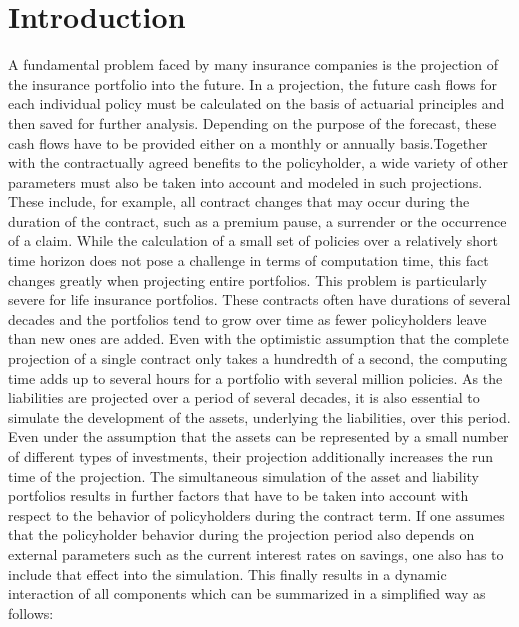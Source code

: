 

\chapter{Introduction}
\label{cha:introduction}

A fundamental problem faced by many insurance companies is the projection of the insurance portfolio into the future. In a projection, the future cash flows for each individual policy must be calculated on the basis of actuarial principles and then saved for further analysis. Depending on the purpose of the forecast, these cash flows have to be provided either on a monthly or annually basis.Together with the contractually agreed benefits to the policyholder, a wide variety of other parameters must also be taken into account and modeled in such projections. These include, for example, all contract changes that may occur during the duration of the contract, such as a premium pause, a surrender or the occurrence of a claim. While the calculation of a small set of policies over a relatively short time horizon does not pose a challenge in terms of computation time, this fact changes greatly when projecting entire portfolios. This problem is particularly severe for life insurance portfolios. These contracts often have durations of several decades and the portfolios tend to grow over time as fewer policyholders leave than new ones are added. Even with the optimistic assumption that the complete projection of a single contract only takes a hundredth of a second, the computing time adds up to several hours for a portfolio with several million policies. As the liabilities are projected over a period of several decades, it is also essential to simulate the development of the assets, underlying the liabilities, over this period. Even under the assumption that the assets can be represented by a small number of different types of investments, their projection additionally increases the run time of the projection. The simultaneous simulation of the asset and liability portfolios results in further factors that have to be taken into account with respect to the behavior of policyholders during the contract term. If one assumes that the policyholder behavior during the projection period also depends on external parameters such as the current interest rates on savings, one also has to include that effect into the simulation. This finally results in a dynamic interaction of all components which can be summarized in a simplified way as follows:

